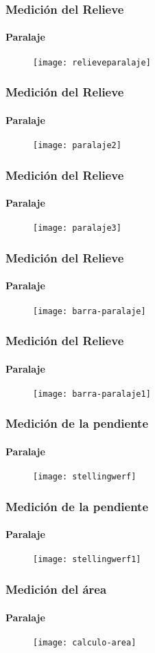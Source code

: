 \documentclass[14pt]{beamer}
\begin{document}
\begin{frame}
\frametitle{Medición del Relieve}
\framesubtitle{Paralaje}
 \begin{figure}
    \centering
    \texttt{[image: relieveparalaje]}
  \end{figure}
\end{frame}
\begin{frame}
\frametitle{Medición del Relieve}
\framesubtitle{Paralaje}
 \begin{figure}
    \centering
    \texttt{[image: paralaje2]}
  \end{figure}
\end{frame}
\begin{frame}
\frametitle{Medición del Relieve}
\framesubtitle{Paralaje}
 \begin{figure}
    \centering
    \texttt{[image: paralaje3]}
  \end{figure}
\end{frame}
\begin{frame}
\frametitle{Medición del Relieve}
\framesubtitle{Paralaje}
 \begin{figure}
    \centering
    \texttt{[image: barra-paralaje]}
  \end{figure}
\end{frame}
\begin{frame}
\frametitle{Medición del Relieve}
\framesubtitle{Paralaje}
 \begin{figure}
    \centering
    \texttt{[image: barra-paralaje1]}
  \end{figure}
\end{frame}
\begin{frame}
\frametitle{Medición de la pendiente}
\framesubtitle{Paralaje}
 \begin{figure}
    \centering
    \texttt{[image: stellingwerf]}
  \end{figure}
\end{frame}
\begin{frame}
\frametitle{Medición de la pendiente}
\framesubtitle{Paralaje}
 \begin{figure}
    \centering
    \texttt{[image: stellingwerf1]}
  \end{figure}
\end{frame}
\begin{frame}
\frametitle{Medición del área}
\framesubtitle{Paralaje}
 \begin{figure}
    \centering
    \texttt{[image: calculo-area]}
  \end{figure}
\end{frame}
\end{document}
